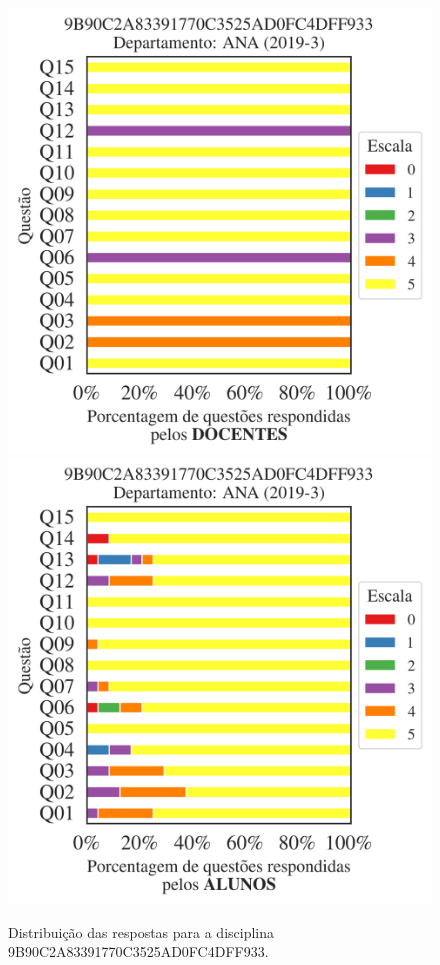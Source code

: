 \documentclass[a4paper,10pt]{article}
\begin{document}
\begin{figure}[h]
\centering
\includegraphics[width=0.485\linewidth]{analise_disciplina_departamento_ANA_9B90C2A83391770C3525AD0FC4DFF933_docentes.png}
\includegraphics[width=0.485\linewidth]{analise_disciplina_departamento_ANA_9B90C2A83391770C3525AD0FC4DFF933_alunos.png}
\caption{\label{fig:analise_geral_departamento}                Distribuição das respostas para a disciplina 9B90C2A83391770C3525AD0FC4DFF933. }
\end{figure}
\end{document}
